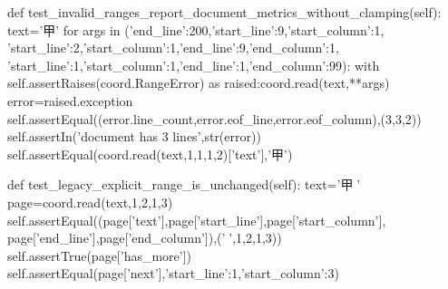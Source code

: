     def test_invalid_ranges_report_document_metrics_without_clamping(self):
        text='甲'
        for args in ({'end_line':200},{'start_line':9,'start_column':1},
                     {'start_line':2,'start_column':1,'end_line':9,'end_column':1},
                     {'start_line':1,'start_column':1,'end_line':1,'end_column':99}):
            with self.assertRaises(coord.RangeError) as raised:coord.read(text,**args)
            error=raised.exception
            self.assertEqual((error.line_count,error.eof_line,error.eof_column),(3,3,2))
            self.assertIn('document has 3 lines',str(error))
        self.assertEqual(coord.read(text,1,1,1,2)['text'],'甲')

    def test_legacy_explicit_range_is_unchanged(self):
        text='甲🧸\n'
        page=coord.read(text,1,2,1,3)
        self.assertEqual((page['text'],page['start_line'],page['start_column'],
                          page['end_line'],page['end_column']),('🧸',1,2,1,3))
        self.assertTrue(page['has_more'])
        self.assertEqual(page['next'],{'start_line':1,'start_column':3})


